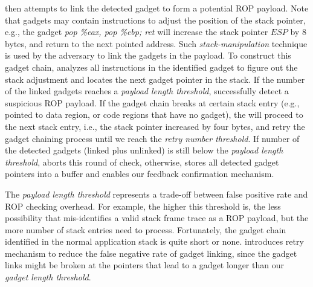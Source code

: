 \name then attempts to link the detected gadget to form a potential
ROP payload. Note that gadgets may contain instructions to adjust
the position of the stack pointer, e.g., the
gadget \emph{pop \%eax, pop \%ebp; ret} will increase the stack
pointer $ESP$ by 8 bytes, and return to the next pointed address.
Such \emph{stack-manipulation} technique is used by the adversary to link the gadgets
in the payload. To construct this gadget chain, \name analyzes all
instructions in the identified gadget to figure out the stack adjustment
and locates the next gadget pointer in the stack. If the number
of the linked gadgets reaches a {\em payload length threshold}, \name
successfully detect a suspicious ROP payload. If the gadget chain breaks
at certain stack entry (e.g., pointed to data region, or code regions
that have no gadget), the \name will proceed to the next stack entry, i.e.,
the stack pointer increased by four bytes, and retry the gadget chaining
process until we reach the {\em retry number threshold}.
If number of the detected gadgets (linked plus unlinked) is still below
the {\em payload length threshold}, \name aborts this round of check,
otherwise, \name stores all detected gadget pointers into a buffer
and enables our feedback confirmation mechanism.

The {\em payload length threshold} represents a trade-off between false
positive rate and ROP checking overhead. For example, the higher
this threshold is, the less possibility that \name mis-identifies
a valid stack frame trace as a ROP payload, but the more number
of stack entries \name need to process. Fortunately, the gadget chain identified
in the normal application stack is quite short or none.
\name introduces retry mechanism to reduce the false
negative rate of gadget linking, since the gadget links might be
broken at the pointers that lead to a gadget longer than our {\em gadget
length threshold}.


